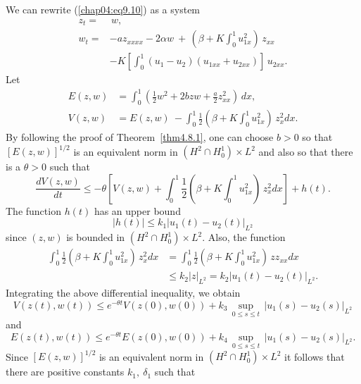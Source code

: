 \documentclass{surv-l}
\theoremstyle{plain}
\theoremstyle{definition}
\numberwithin{equation}{section}
\numberwithin{figure}{chapter}
\begin{document}
We can rewrite (\ref{chap04:eq9.10}) as a system
\begin{equation}\label{chap04:eq9.11}
\begin{split}
z_{t}=&\,w,\\
w_{t}=& -az_{xxxx}-2\alpha w\ +\,\left(\beta+K\int_{0}^{1}u_{1x}^{2}\right)\,z_{xx}\\
& -K\left[\int_{0}^{1}(u_{1}-u_{2})(u_{1xx}+u_{2xx})\right]\,u_{2xx}.
\end{split}
\end{equation}
Let
\begin{align*}
E(z, w)&=\int_{0}^{1}\left(\frac{1}{2}w^{2}+2bzw+\frac{a}{2}z_{xx}^{2}\right)\,dx,\\
V(z, w)&=E(z, w)\ -\int_{0}^{1}\frac{1}{2}\left(\beta+K\int_{0}^{1}u_{1x}^{2}\right)\,z_{x}^{2}dx.
\end{align*}
By following the proof of Theorem~\ref{thm4.8.1}, one can choose $b>0$ so that $[E(z, w)]^{1/2}$ is an equivalent norm in $(H^{2}\cap H_{0}^{1})\times L^{2}$ and also so that there is a $\theta>0$ such that
\begin{equation*}
\frac{dV(z,w)}{dt}\leq-\theta\left[V(z, w)+\int_{0}^{1}\frac{1}{2}\left(\beta+K\int_{0}^{1}u_{1x}^{2}\right)\,z_{x}^{2}dx\right] + h(t).
\end{equation*}
The function $h(t)$ has an upper bound
\begin{equation*}
|h(t)|\leq k_{1}|u_{1}(t)-u_{2}(t)|_{L^{2}}
\end{equation*}
since $(z, w)$ is bounded in $(H^{2}\cap H_{0}^{1})\times L^{2}$. Also, the function
\begin{align*}
\int_{0}^{1}\frac{1}{2}\left(\beta+K\int_{0}^{1}u_{1x}^{2}\right)\,z_{x}^{2}dx &=\int_{0}^{1}\frac{1}{2}
\left(\beta+K\int_{0}^{1}u_{1x}^{2}\right)\,zz_{xx}dx \\
& \leq k_{2}|z|_{L^{2}}=k_{2}|u_{1}(t)-u_{2}(t)|_{L^{2}}.
\end{align*}
Integrating the above differential inequality, we obtain
\begin{equation*}
V(z(t), w(t))\leq e^{-\theta t}V(z(0), w(0))+k_{3}\,\sup_{0\leq s\leq t}\,|u_{1}(s) - u_{2}(s)|_{L^{2}}
\end{equation*}
and
\begin{equation*}
E(z(t), w(t))\leq e^{-\theta t}E(z(0), w(0))+k_{4}\,\sup_{0\leq s\leq t}\,|u_{1}(s)-u_{2}(s)|_{L^{2}}.
\end{equation*}
Since $[E(z, w)]^{1/2}$ is an equivalent norm in $(H^{2}\cap H_{0}^{1}) \times L^{2}$ it follows that there are positive constants $k_{1},\ \delta_{1}$ such that
\end{document}
